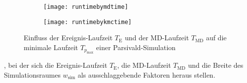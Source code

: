 \begin{figure}
  
  \captionsetup[subfigure]{singlelinecheck=false}
  \def\subfigwidth{7cm}
  \begin{subfigure}[t]{\subfigwidth}
    \texttt{[image: runtimebymdtime]}
  \end{subfigure}
  \hfill
  \begin{subfigure}[t]{\subfigwidth}
    \texttt{[image: runtimebykmctime]}
  \end{subfigure}

  \caption{Einfluss der Ereignis-Laufzeit $T_\text{E}$ und der MD-Laufzeit $T_\text{MD}$ auf die minimale Laufzeit $T_{p_\text{max}}$ einer Parsivald-Simulation}
  
\end{figure}

\todoline[Fazit]

, bei der sich die Ereignis-Laufzeit $T_\text{E}$, die MD-Laufzeit $T_\text{MD}$ und die Breite des Simulationsraumes $w_\text{sim}$ als ausschlaggebende Faktoren heraus stellen.
